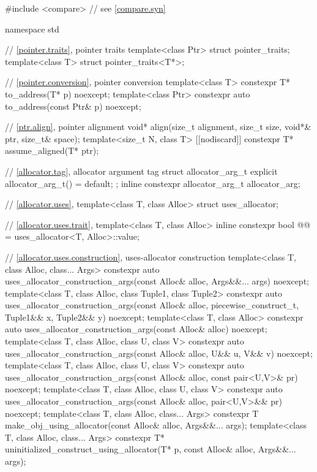 \begin{codeblock}
#include <compare>              // see \ref{compare.syn}

namespace std {
  // \ref{pointer.traits}, pointer traits
  template<class Ptr> struct pointer_traits;
  template<class T> struct pointer_traits<T*>;

  // \ref{pointer.conversion}, pointer conversion
  template<class T>
    constexpr T* to_address(T* p) noexcept;
  template<class Ptr>
    constexpr auto to_address(const Ptr& p) noexcept;

  // \ref{ptr.align}, pointer alignment
  void* align(size_t alignment, size_t size, void*& ptr, size_t& space);
  template<size_t N, class T>
    [[nodiscard]] constexpr T* assume_aligned(T* ptr);

  // \ref{allocator.tag}, allocator argument tag
  struct allocator_arg_t { explicit allocator_arg_t() = default; };
  inline constexpr allocator_arg_t allocator_arg{};

  // \ref{allocator.uses}, 
  template<class T, class Alloc> struct uses_allocator;

  // \ref{allocator.uses.trait}, 
  template<class T, class Alloc>
    inline constexpr bool @@ = uses_allocator<T, Alloc>::value;

  // \ref{allocator.uses.construction}, uses-allocator construction
  template<class T, class Alloc, class... Args>
    constexpr auto uses_allocator_construction_args(const Alloc& alloc,
                                                    Args&&... args) noexcept;
  template<class T, class Alloc, class Tuple1, class Tuple2>
    constexpr auto uses_allocator_construction_args(const Alloc& alloc, piecewise_construct_t,
                                                    Tuple1&& x, Tuple2&& y) noexcept;
  template<class T, class Alloc>
    constexpr auto uses_allocator_construction_args(const Alloc& alloc) noexcept;
  template<class T, class Alloc, class U, class V>
    constexpr auto uses_allocator_construction_args(const Alloc& alloc,
                                                    U&& u, V&& v) noexcept;
  template<class T, class Alloc, class U, class V>
    constexpr auto uses_allocator_construction_args(const Alloc& alloc,
                                                    const pair<U,V>& pr) noexcept;
  template<class T, class Alloc, class U, class V>
    constexpr auto uses_allocator_construction_args(const Alloc& alloc,
                                                    pair<U,V>&& pr) noexcept;
  template<class T, class Alloc, class... Args>
    constexpr T make_obj_using_allocator(const Alloc& alloc, Args&&... args);
  template<class T, class Alloc, class... Args>
    constexpr T* uninitialized_construct_using_allocator(T* p, const Alloc& alloc,
                                                         Args&&... args);

}
\end{codeblock}
